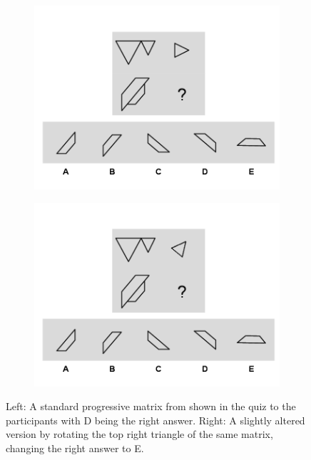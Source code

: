 \begin{figure}[H]
  \centering
  \begin{subfigure}[t]{0.45\textwidth}
    \includegraphics[width=\textwidth]{img/q-17.png}
  \end{subfigure}
  \hspace{5mm}
  \begin{subfigure}[t]{0.45\textwidth}
    \includegraphics[width=\textwidth]{img/q-57.png}
  \end{subfigure}
  \caption{Left: A standard progressive matrix from \textcite{albuquerqueDoesGenderStereotype2017} shown in the quiz to the participants with D being the right answer. Right: A slightly altered version by rotating the top right triangle of the same matrix, changing the right answer to E.}
  \label{fig:figureMatrices}
\end{figure}
